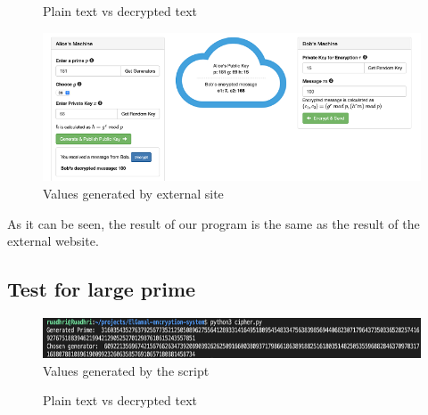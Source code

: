 \documentclass[a4paper,12pt]{article}
\begin{document}
\begin{figure}[h]%
    \centering
    \qquad
    \caption{Plain text vs decrypted text}%
\end{figure}
 
\begin{figure}[h]%
    \includegraphics{externalExample.png}%
    \centering 
    \caption{Values generated by external site}%
\end{figure}%
As it can be seen, the result of our program is the same as the result of the external website.
\newpage
\subsection{Test for large prime}
\begin{figure}[h]%
    \includegraphics{largePrime.PNG}%
    \centering 
    \caption{Values generated by the script}%
\end{figure}%
\begin{figure}[h]%
    \centering
    \qquad
    \caption{Plain text vs decrypted text}%
\end{figure}
\end{document}
